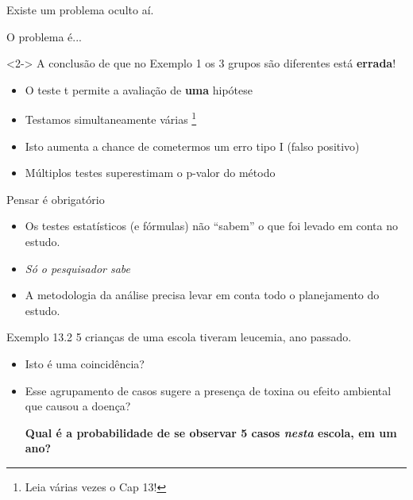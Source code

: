 \documentclass{beamer}
\begin{document}
\begin{frame}{}
  \begin{center}
    Existe um problema oculto aí.
  \end{center}
\end{frame}

\begin{frame}{}
  \begin{center}
    O problema é...
  \end{center}

  \begin{block}{}<2->
    A conclusão de que no Exemplo 1 os 3 grupos são diferentes está {\bf errada}!
      \end{block}
  \begin{itemize}
  \item<3-> O teste t permite a avaliação de {\bf uma} hipótese
  \item<3-> Testamos simultaneamente várias \footnote{Leia várias vezes o Cap 13!}
  \item<3-> Isto aumenta a chance de cometermos um erro tipo I (falso positivo)
  \item<3-> Múltiplos testes superestimam o p-valor do método
  \end{itemize}
\end{frame}

\begin{frame}{Pensar é obrigatório}
  \begin{itemize}
  \item Os testes estatísticos (e fórmulas) não ``sabem'' o que foi levado em conta no estudo.
  \item {\em Só o pesquisador sabe}
  \item A metodologia da análise precisa levar em conta todo o planejamento do estudo.
  \end{itemize}
\end{frame}

\begin{frame}
  \begin{exampleblock}{Exemplo 13.2}
    5 crianças de uma escola tiveram leucemia, ano passado.

    \begin{itemize}
    \item Isto é uma coincidência?
    \item Esse agrupamento de casos sugere a presença de toxina ou efeito ambiental que causou a doença?

      \bigskip
      {\bf Qual é a probabilidade de se observar 5 casos {\em nesta} escola, em um ano?}
    \end{itemize}
  \end{exampleblock}
\end{frame}
\end{document}
